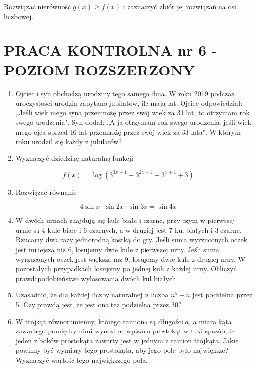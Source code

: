 \documentclass[10pt]{article}
\begin{document}
Rozwiązać nierówność $g(x) \geqslant f(x)$ i zaznaczyć zbiór jej rozwiązań na osi liczbowej.

\section*{PRACA KONTROLNA nr 6 - POZIOM ROZSZERZONY}
\begin{enumerate}
  \item Ojciec i syn obchodzą urodziny tego samego dnia. W roku 2019 podczas uroczystości urodzin zapytano jubilatów, ile mają lat. Ojciec odpowiedział: „Jeśli wiek mego syna przemnożę przez swój wiek za 31 lat, to otrzymam rok swego urodzenia". Syn dodał: „A ja otrzymam rok swego urodzenia, jeśli wiek mego ojca sprzed 16 lat przemnożę przez swój wiek za 33 lata". W którym roku urodził się każdy z jubilatów?
  \item Wyznaczyć dziedzinę naturalną funkcji
\end{enumerate}

$$
f(x)=\log \left(3^{3 x-1}-3^{2 x-1}-3^{x+1}+3\right)
$$

\begin{enumerate}
  \setcounter{enumi}{2}
  \item Rozwiązać równanie
\end{enumerate}

$$
4 \sin x \cdot \sin 2 x \cdot \sin 3 x=\sin 4 x
$$

\begin{enumerate}
  \setcounter{enumi}{3}
  \item W dwóch urnach znajdują się kule białe i czarne, przy czym w pierwszej urnie są 4 kule białe i 6 czarnych, a w drugiej jest 7 kul białych i 3 czarne. Rzucamy dwa razy jednorodną kostką do gry. Jeśli suma wyrzuconych oczek jest mniejsza niż 6, losujemy dwie kule z pierwszej urny. Jeśli suma wyrzuconych oczek jest większa niż 9, losujemy dwie kule z drugiej urny. W pozostałych przypadkach losujemy po jednej kuli z każdej urny. Obliczyć prawdopodobieństwo wylosowania dwóch kul białych.
  \item Uzasadnić, że dla każdej liczby naturalnej $n$ liczba $n^{5}-n$ jest podzielna przez 5. Czy prawdą jest, że jest ona też podzielna przez 30?
  \item W trójkąt równoramienny, którego ramiona są długości $a$, a miara kąta zawartego pomiędzy nimi wynosi $\alpha$, wpisano prostokąt w taki sposób, że jeden z boków prostokąta zawarty jest w jednym z ramion trójkąta. Jakie powinny być wymiary tego prostokąta, aby jego pole było największe? Wyznaczyć wartość tego największego pola.
\end{enumerate}
\end{document}
